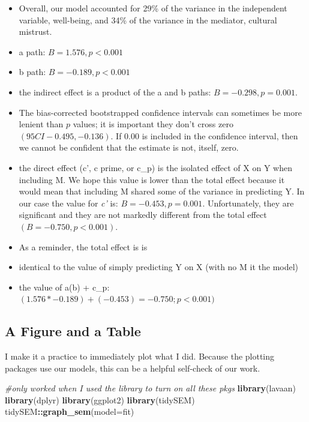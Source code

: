 \documentclass[
  11pt,
]{book}
\newenvironment{Shaded}{\begin{snugshade}}{\end{snugshade}}
\newcommand{\AttributeTok}[1]{\textcolor[rgb]{0.27,0.27,0.27}{#1}}
\newcommand{\CommentTok}[1]{\textcolor[rgb]{0.37,0.37,0.37}{\textit{#1}}}
\newcommand{\FunctionTok}[1]{\textcolor[rgb]{0.27,0.27,0.27}{\textbf{#1}}}
\newcommand{\NormalTok}[1]{#1}
\newcommand{\SpecialCharTok}[1]{\textcolor[rgb]{0.43,0.43,0.43}{\textbf{#1}}}
\providecommand{\tightlist}{%
  \setlength{\itemsep}{0pt}\setlength{\parskip}{0pt}}
\begin{document}
\begin{itemize}
\tightlist
\item
  Overall, our model accounted for 29\% of the variance in the independent variable, well-being, and 34\% of the variance in the mediator, cultural mistrust.
\item
  a path: \(B = 1.576, p < 0.001\)
\item
  b path: \(B = -0.189, p < 0.001\)
\item
  the indirect effect is a product of the a and b paths: \(B = -0.298, p = 0.001\).
\item
  The bias-corrected bootstrapped confidence intervals can sometimes be more lenient than \(p\) values; it is important they don't cross zero \((95CI -0.495, -0.136 )\). If 0.00 is included in the confidence interval, then we cannot be confident that the estimate is not, itself, zero.
\item
  the direct effect (c', c prime, or c\_p) is the isolated effect of X on Y when including M. We hope this value is lower than the total effect because it would mean that including M shared some of the variance in predicting Y. In our case the value for \emph{c'} is: \(B = -0.453, p = 0.001\). Unfortunately, they are significant and they are not markedly different from the total effect \((B = -0.750, p < 0.001)\).
\item
  As a reminder, the total effect is is
\item
  identical to the value of simply predicting Y on X (with no M it the model)
\item
  the value of a(b) + c\_p: \((1.576*-0.189) + (-0.453) = -0.750; p < 0.001)\)
\end{itemize}

\hypertarget{a-figure-and-a-table}{%
\subsection{A Figure and a Table}\label{a-figure-and-a-table}}

I make it a practice to immediately plot what I did. Because the plotting packages use our models, this can be a helpful self-check of our work.

\begin{Shaded}
\begin{Highlighting}[]
\CommentTok{\#only worked when I used the library to turn on all these pkgs}
\FunctionTok{library}\NormalTok{(lavaan)}
\FunctionTok{library}\NormalTok{(dplyr)}
\FunctionTok{library}\NormalTok{(ggplot2)}
\FunctionTok{library}\NormalTok{(tidySEM)}
\NormalTok{tidySEM}\SpecialCharTok{::}\FunctionTok{graph\_sem}\NormalTok{(}\AttributeTok{model=}\NormalTok{fit)}
\end{Highlighting}
\end{Shaded}
\end{document}
